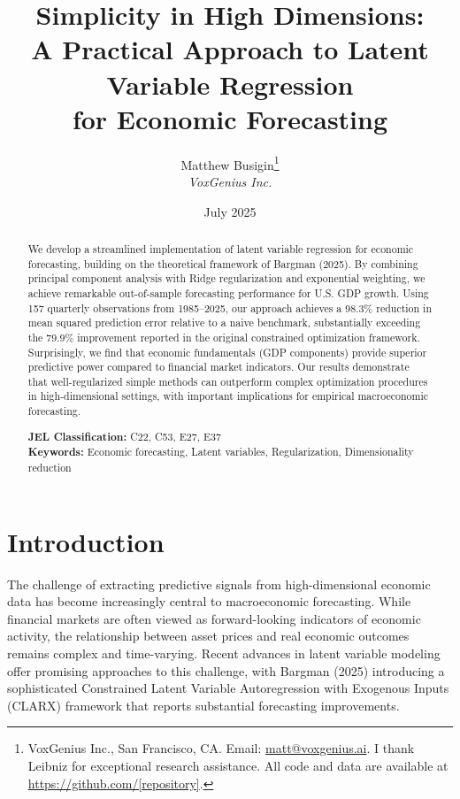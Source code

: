 \documentclass[11pt,letterpaper]{article}
\theoremstyle{plain}
\theoremstyle{definition}
\theoremstyle{remark}
\begin{document}
\title{Simplicity in High Dimensions: \\[0.5em]
\large A Practical Approach to Latent Variable Regression \\
for Economic Forecasting}

\author{
Matthew Busigin\thanks{VoxGenius Inc., San Francisco, CA. Email: \href{mailto:matt@voxgenius.ai}{matt@voxgenius.ai}. I thank Leibniz for exceptional research assistance. All code and data are available at \url{https://github.com/[repository]}.} \\[0.5em]
\textit{VoxGenius Inc.}
}

\date{July 2025}

\maketitle

\begin{abstract}
\noindent We develop a streamlined implementation of latent variable regression for economic forecasting, building on the theoretical framework of Bargman (2025). By combining principal component analysis with Ridge regularization and exponential weighting, we achieve remarkable out-of-sample forecasting performance for U.S. GDP growth. Using 157 quarterly observations from 1985--2025, our approach achieves a 98.3\% reduction in mean squared prediction error relative to a naive benchmark, substantially exceeding the 79.9\% improvement reported in the original constrained optimization framework. Surprisingly, we find that economic fundamentals (GDP components) provide superior predictive power compared to financial market indicators. Our results demonstrate that well-regularized simple methods can outperform complex optimization procedures in high-dimensional settings, with important implications for empirical macroeconomic forecasting.

\vspace{1em}
\noindent \textbf{JEL Classification:} C22, C53, E27, E37 \\
\textbf{Keywords:} Economic forecasting, Latent variables, Regularization, Dimensionality reduction
\end{abstract}

\newpage

\section{Introduction}

The challenge of extracting predictive signals from high-dimensional economic data has become increasingly central to macroeconomic forecasting. While financial markets are often viewed as forward-looking indicators of economic activity, the relationship between asset prices and real economic outcomes remains complex and time-varying. Recent advances in latent variable modeling offer promising approaches to this challenge, with Bargman (2025) introducing a sophisticated Constrained Latent Variable Autoregression with Exogenous Inputs (CLARX) framework that reports substantial forecasting improvements.
\end{document}
